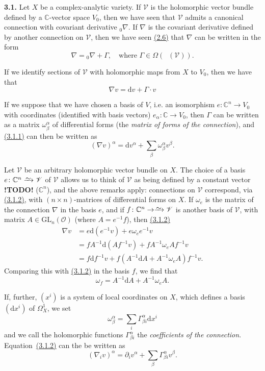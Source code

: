 \documentclass{report}
\newenvironment{rmenv}[1]
  {\phantomsection\par\medskip\noindent\textbf{#1.}\rmfamily}
  {\medskip}
\newcommand{\scr}[1]{{\mathscr{#1}}}
\renewcommand{\cal}[1]{{\mathcal{#1}}}
\newcommand{\CC}{\mathbb{C}}
\newcommand{\dd}{\mathrm{d}}
\newcommand{\GL}{\mathrm{GL}}
\newcommand{\simto}{\xrightarrow{\raisebox{-0.7ex}[0ex][0ex]{$\sim$}}}
\DeclareMathOperator{\shEnd}{\underline{End}}
\newcommand{\todo}{\textbf{ !TODO! }}
\newcommand{\oldpage}[1]{\marginpar{\footnotesize$\Big\vert$ \textit{p.~#1}}}
\begin{document}
\begin{rmenv}{3.1}
\label{I.3.1}
  Let $X$ be a complex-analytic variety.
  If $\scr{V}$ is the holomorphic vector bundle defined by a $\CC$-vector space $V_0$, then we have seen that $\scr{V}$ admits a canonical connection with covariant derivative ${}_0\!\nabla$.
  If $\nabla$ is the covariant derivative defined by another connection on $\scr{V}$, then we have seen \hyperref[I.2.6]{(2.6)} that $\nabla$ can be written in the form
  \[
    \nabla = {}_0\!\nabla + \Gamma,
    \quad\mbox{where $\Gamma\in\Omega(\shEnd(\scr{V}))$.}
  \]

  If we identify sections of $\scr{V}$ with holomorphic maps from $X$ to $V_0$, then we have that
  \[
  \label{I.3.1.1}
    \nabla v = \dd v + \Gamma\cdot v
  \tag{3.1.1}
  \]

  If we suppose that we have chosen a basis of $V$, i.e. an isomorphism $e\colon\CC^n\to V_0$ with coordinates (identified with basis vectors) $e_\alpha\colon\CC\to V_0$, then $\Gamma$ can be written as a matrix $\omega_\beta^\alpha$ of differential forms (the \emph{matrix of forms of the connection}), and \hyperref[I.3.1.1]{(3.1.1)} can then be written as
  \[
  \label{I.3.1.2}
    (\nabla v)^\alpha = \dd v^\alpha + \sum_\beta \omega_\beta^\alpha v^\beta.
  \tag{3.1.2}
  \]

  Let $\scr{V}$ be an arbitrary holomorphic vector bundle on $X$.
  The choice of a basis $e\colon\CC^n\simto\scr{V}$ of $\scr{V}$ allows us to think of $\scr{V}$ as being defined by a
\oldpage{22}
  constant vector \todo ($\CC^n$), and the above remarks apply:
  connections on $\scr{V}$ correspond, via \hyperref[I.3.1.2]{(3.1.2)}, with $(n\times n)$-matrices of differential forms on $X$.
  If $\omega_e$ is the matrix of the connection $\nabla$ in the basis $e$, and if $f\colon\CC^n\to\simto\scr{V}$ is another basis of $\scr{V}$, with matrix $A\in\GL_n(\cal{O})$ (where $A=e^{-1}f$), then \hyperref[I.3.1.2]{(3.1.2)}
  \[
    \begin{aligned}
      \nabla v
      &= e\dd(e^{-1}v) + e\omega_e e^{-1}v
    \\&= fA^{-1}\dd(Af^{-1}v) + fA^{-1}\omega_e Af^{-1}v
    \\&= f\dd f^{-1}v + f(A^{-1}\dd A + A^{-1}\omega_e A)f^{-1}v.
    \end{aligned}
  \]
  Comparing this with \hyperref[I.3.1.2]{(3.1.2)} in the basis $f$, we find that
  \[
  \label{I.3.1.3}
    \omega_f = A^{-1}\dd A + A^{-1}\omega_e A.
  \tag{3.1.3}
  \]

  If, further, $(x^i)$ is a system of local coordinates on $X$, which defines a basis $(\dd x^i)$ of $\Omega_X^1$, we set
  \[
    \omega_\beta^\alpha = \sum_i \Gamma_{\beta i}^\alpha \dd x^i
  \]
  and we call the holomorphic functions $\Gamma_{\beta i}^\alpha$ the \emph{coefficients of the connection}.
  Equation~\hyperref[I.3.1.2]{(3.1.2)} can the be written as
  \[
  \label{I.3.1.4}
    (\nabla_i v)^\alpha = \partial_i v^\alpha + \sum_\beta \Gamma_{\beta i}^\alpha v^\beta.
  \tag{3.1.4}
  \]


\end{rmenv}
\end{document}
